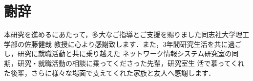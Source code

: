 \documentclass[a4paper,11pt]{ujreport}
\begin{document}
\clearpage

\chapter*{謝辞}
\label{chap:Acknowledgments}

本研究を進めるにあたって，多大なご指導とご支援を賜りました同志社大学理工学部の佐藤健哉
教授に心より感謝致します．また，3年間研究生活を共に過ごし，研究に就職活動と共に乗り越えた
ネットワーク情報システム研究室の同期，研究・就職活動の相談に乗ってくださった先輩，研究室生
活で慕ってくれた後輩，さらに様々な場面で支えてくれた家族と友人へ感謝します．
\clearpage


\renewcommand{\bibname}{参考文献}






\clearpage

\renewcommand{\bibname}{研究業績}

\end{document}
